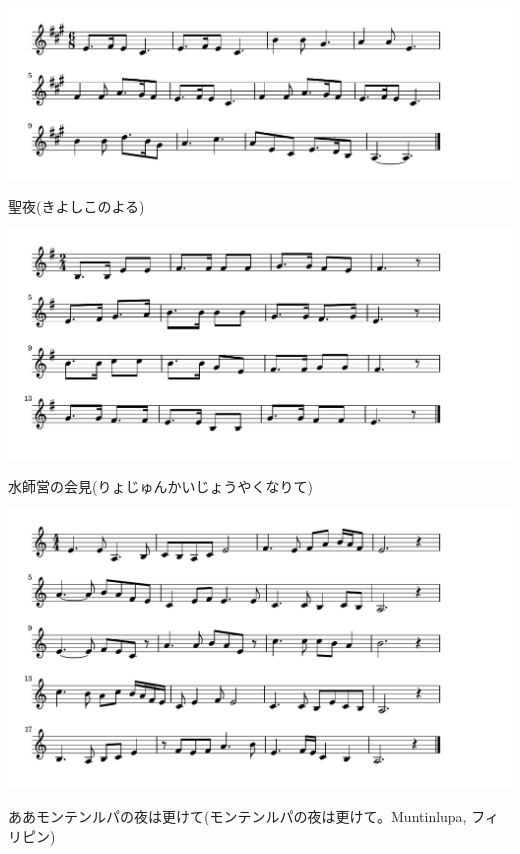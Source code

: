 \documentclass[a4paper]{ltjsarticle}
\begin{document}
\includegraphics[clip]{kiyoshi_crop.pdf}

\vspace{-10mm} \hspace{10mm}
聖夜(きよしこのよる)

\includegraphics[clip]{suishiei_crop.pdf}

\vspace{-10mm} \hspace{10mm}
水師営の会見(りょじゅんかいじょうやくなりて)

\includegraphics[clip]{muntinlupa_crop.pdf}

\vspace{-10mm} \hspace{10mm}
ああモンテンルパの夜は更けて(モンテンルパの夜は更けて。Muntinlupa, フィリピン)
\end{document}
